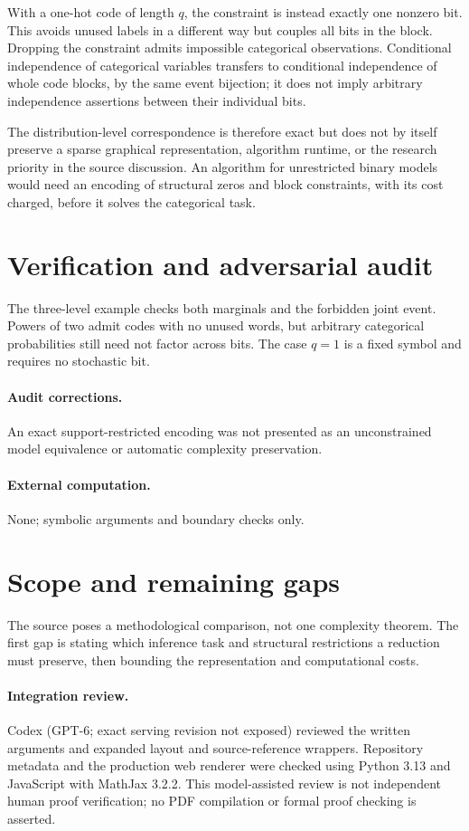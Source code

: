 \documentclass[11pt]{article}
\begin{document}
With a one-hot code of length $q$, the constraint is instead exactly one
nonzero bit. This avoids unused labels in a different way but couples all
bits in the block. Dropping the constraint admits impossible categorical
observations. Conditional independence of categorical variables transfers to
conditional independence of whole code blocks, by the same event bijection;
it does not imply arbitrary independence assertions between their individual bits.

The distribution-level correspondence is therefore exact but does not by itself
preserve a sparse graphical representation, algorithm runtime, or the research
priority in the source discussion. An algorithm for unrestricted binary models
would need an encoding of structural zeros and block constraints, with its
cost charged, before it solves the categorical task.
\section{Verification and adversarial audit}
The three-level example checks both marginals and the forbidden joint
event. Powers of two admit codes with no unused words, but arbitrary categorical
probabilities still need not factor across bits. The case $q=1$ is a fixed
symbol and requires no stochastic bit.
\paragraph{Audit corrections.} An exact support-restricted encoding was not presented as an unconstrained model equivalence or automatic complexity preservation.
\paragraph{External computation.} None; symbolic arguments and boundary checks only.
\section{Scope and remaining gaps}
The source poses a methodological comparison, not one complexity theorem.
The first gap is stating which inference task and structural restrictions a
reduction must preserve, then bounding the representation and computational costs.
\paragraph{Integration review.} Codex (GPT-6; exact serving revision not exposed) reviewed the written arguments and expanded layout and source-reference wrappers. Repository metadata and the production web renderer were checked using Python 3.13 and JavaScript with MathJax 3.2.2. This model-assisted review is not independent human proof verification; no PDF compilation or formal proof checking is asserted.
\end{document}
